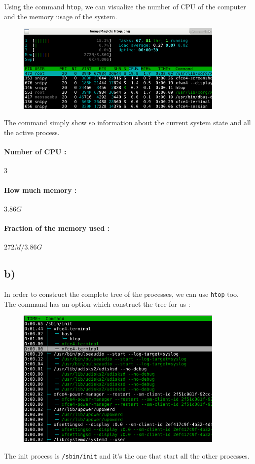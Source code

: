 \documentclass[a4paper,11pt]{report}
\begin{document}
Using the command \verb|htop|, we can visualize the number of CPU of the
computer and the memory usage of the system.

\begin{figure}[ht]
  \centering
  \includegraphics[width=0.9\textwidth]{img/htop}
\end{figure}

The command simply show so information about the current system state and all
the active process.

\paragraph{Number of CPU :} $3$

\paragraph{How much memory :} $3.86G$

\paragraph{Fraction of the memory used :} $272M / 3.86G$

\newpage

\subsection*{b)}

In order to construct the complete tree of the processes, we can use \verb|htop|
too. The command has an option which construct the tree for us :

\begin{figure}[h]
  \centering
  \includegraphics[width=0.9\textwidth]{img/tree}
\end{figure}

The init process is \verb|/sbin/init| and it's the one that start all the other
processes.
\end{document}

